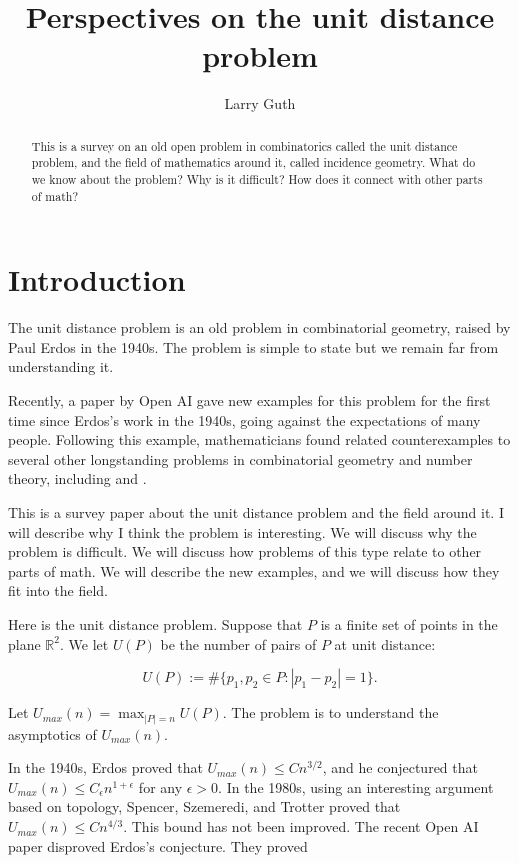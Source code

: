 \documentclass{amsart}
\title{Perspectives on the unit distance problem}
\author{Larry Guth}
\newcommand{\RR}{\mathbb{R}}
\begin{document}
\maketitle


\begin{abstract}
This is a survey on an old open problem in combinatorics called the unit distance problem, and the field of mathematics around it, called incidence geometry.   What do we know about the problem?  Why is it difficult?  How does it connect with other parts of math?
\end{abstract}

\section{Introduction}

The unit distance problem is an old problem in combinatorial geometry,  raised by Paul Erdos in the 1940s.  The problem is simple to state but we remain far from understanding it.

Recently,  a paper by Open AI \cite{OAI} gave new examples for this problem for the first time since Erdos's work in the 1940s,  going against the expectations of many people.   Following this example,  mathematicians found related counterexamples to several other longstanding problems in combinatorial geometry and number theory,  including \cite{BSSZ} and \cite{Po1}.  

This is a survey paper about the unit distance problem and the field around it.   I will describe why I think the problem is interesting.  We will discuss why the problem is difficult.  We will discuss how problems of this type relate to other parts of math.  We will describe the new examples,  and we will discuss how they fit into the field.

Here is the unit distance problem.   Suppose that $P$ is a finite set of points in the plane $\RR^2$.   We let $U(P)$ be the number of pairs of $P$ at unit distance:

$$ U(P) := \# \{ p_1, p_2 \in P: |p_1 - p_2| = 1 \}. $$

\noindent Let $U_{max}(n) = \max_{|P| = n} U(P)$.   The problem is to understand the asymptotics of $U_{max}(n)$.

In the 1940s,  Erdos proved that $U_{max}(n) \le C n^{3/2}$,  and he conjectured that $U_{max}(n) \le C_\epsilon n^{1 + \epsilon}$ for any $\epsilon > 0$.   In the 1980s, using an interesting argument based on topology,  Spencer,  Szemeredi,  and Trotter \cite{SST} proved that $U_{max}(n) \le C n^{4/3}$.   This bound has not been improved.   The recent Open AI paper disproved Erdos's conjecture.  They proved
\end{document}
